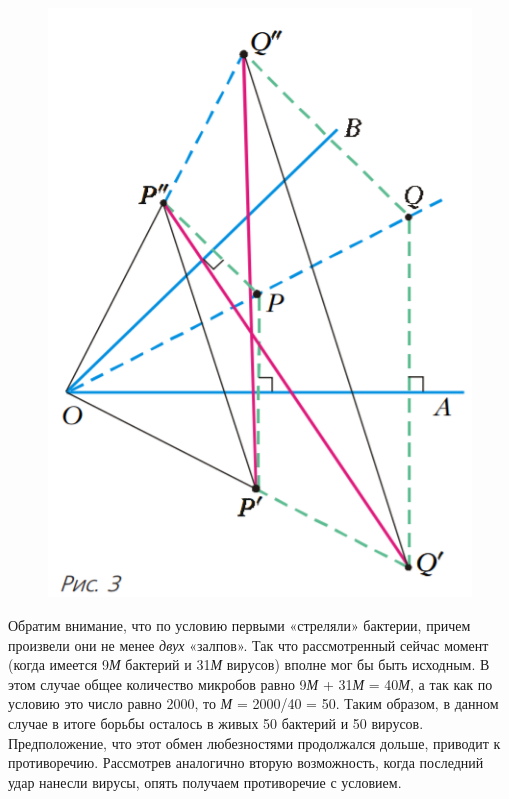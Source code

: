 \setcounter{page}{56} %
\newpage
\setlength{\columnsep}{1cm} %
\begin{multicols}{2} %
\fancyhf{}
\rhead{\thepage}
\begin{figure}
\includegraphics[scale=0.5]{img1.png}
\end{figure}
    \noindent
    Обратим внимание, что по условию первыми «стреляли» бактерии, причем произвели они не менее \emph{двух} «залпов». Так что рассмотренный сейчас момент (когда имеется 9\emph{М} бактерий и 31\emph{М} вирусов) вполне мог бы быть исходным. В этом случае общее количество микробов равно 9\emph{М} + 31\emph{М} = 40\emph{М}, а так как по условию это число равно 2000, то \emph{М} = 2000/40 = 50. Таким образом, в данном случае в итоге борьбы осталось в живых 50 бактерий и 50 вирусов. Предположение, что этот обмен любезностями продолжался дольше, приводит к противоречию. Рассмотрев аналогично вторую возможность, когда последний удар нанесли вирусы, опять получаем противоречие с условием. \\ 

\end{multicols}
